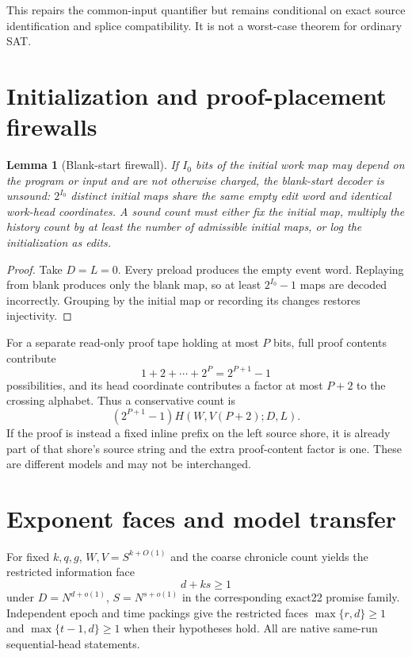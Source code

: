 \documentclass[11pt]{article}
\newtheorem{lemma}{Lemma}
\begin{document}
This repairs the common-input quantifier but remains conditional on exact source identification and splice compatibility.  It is not a worst-case theorem for ordinary SAT.

\section{Initialization and proof-placement firewalls}

\begin{lemma}[Blank-start firewall]
If $I_0$ bits of the initial work map may depend on the program or input and are not otherwise charged, the blank-start decoder is unsound: $2^{I_0}$ distinct initial maps share the same empty edit word and identical work-head coordinates.  A sound count must either fix the initial map, multiply the history count by at least the number of admissible initial maps, or log the initialization as edits.
\end{lemma}

\begin{proof}
Take $D=L=0$.  Every preload produces the empty event word.  Replaying from blank produces only the blank map, so at least $2^{I_0}-1$ maps are decoded incorrectly.  Grouping by the initial map or recording its changes restores injectivity.
\end{proof}

For a separate read-only proof tape holding at most $P$ bits, full proof contents contribute
\[
  1+2+\cdots+2^P=2^{P+1}-1
\]
possibilities, and its head coordinate contributes a factor at most $P+2$ to the crossing alphabet.  Thus a conservative count is
\[
 (2^{P+1}-1)H(W,V(P+2);D,L).
\]
If the proof is instead a fixed inline prefix on the left source shore, it is already part of that shore's source string and the extra proof-content factor is one.  These are different models and may not be interchanged.

\section{Exponent faces and model transfer}

For fixed $k,q,g$, $W,V= S^{k+O(1)}$ and the coarse chronicle count yields the restricted information face
\[
 d+ks\ge 1
\]
under $D=N^{d+o(1)}$, $S=N^{s+o(1)}$ in the corresponding exact22 promise family.  Independent epoch and time packings give the restricted faces $\max\{r,d\}\ge1$ and $\max\{t-1,d\}\ge1$ when their hypotheses hold.  All are native same-run sequential-head statements.
\end{document}
